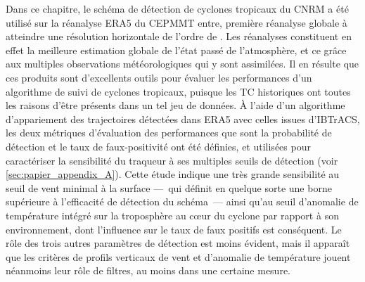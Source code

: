 \documentclass[../main.tex]{subfiles}
\begin{document}
Dans ce chapitre, le schéma de détection de cyclones tropicaux du CNRM a été utilisé sur la réanalyse ERA5 du CEPMMT entre, première
réanalyse globale à atteindre une résolution horizontale de l'ordre de . Les réanalyses constituent en effet la meilleure estimation globale de l'état
passé de l'atmosphère, et ce grâce aux multiples observations météorologiques qui y sont assimilées. Il en résulte que ces produits sont d'excellents outils
pour évaluer les performances d'un algorithme de suivi de cyclones tropicaux, puisque les TC historiques ont toutes les raisons d'être présents dans un tel jeu
de données. À l'aide d'un algorithme d'appariement des trajectoires détectées dans ERA5 avec celles issues d'IBTrACS, les deux métriques d'évaluation des
performances que sont la probabilité de détection et le taux de faux-positivité ont été définies, et utilisées pour caractériser la sensibilité du traqueur à
ses multiples seuils de détection (voir \cref{sec:papier_appendix_A}). Cette étude indique une très grande sensibilité au seuil de vent minimal à la surface
---~qui définit en quelque sorte une borne supérieure à l'efficacité de détection du schéma~--- ainsi qu'au seuil d'anomalie de température intégré sur la
troposphère au cœur du cyclone par rapport à son environnement, dont l'influence sur le taux de faux positifs est conséquent. Le rôle des trois autres
paramètres de détection est moins évident, mais il apparaît que les critères de profils verticaux de vent et d'anomalie de température jouent néanmoins leur
rôle de filtres, au moins dans une certaine mesure.
\end{document}
